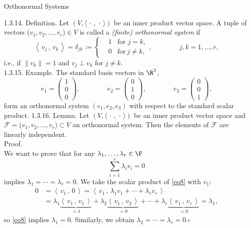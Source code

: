 \documentclass[smaller,hyperref={CJKbookmarks=true}]{beamer}
\newcommand{\myseries}[2]{$#1_1,#1_2,\dots,#1_#2$}
\newcommand{\scp}[2]{\left\langle\,#1\,,\,#2\,\right\rangle} \newcommand{\scpp}{\langle\,\cdot\,,\,\cdot\,\rangle}
\begin{document}
\begin{frame}{Orthonormal Systems}
\begin{spacing}{1}
\alert{1.3.14. Definition.} Let $(V,\scpp)$ be an inner product vector space. A tuple of vectors (\myseries{v}{r})$\in V$ is called a \emph{(finite) orthonormal system} if
\begin{equation*}
  \scp{v_j}{v_k}=\delta_{jk}:=\left\{\begin{aligned}&1\;\;\;\text{for }j=k,\\&0\;\;\;\text{for}~j\neq k,\end{aligned}\right.,\qquad\qquad j,k=1,\ldots,r,
\end{equation*}
i.e., if $\|v_k\|=1$ and $v_j\perp v_k$ for $j\neq k$.\\[12pt]
\alert{1.3.15. Example.} The standard basis vectors in $\R^3$,
\[e_1=\begin{pmatrix}
        1 \\
        0 \\
        0
      \end{pmatrix},\qquad\qquad e_2=\begin{pmatrix}
            0 \\
            1 \\
            0
          \end{pmatrix},\qquad\qquad e_3=\begin{pmatrix}
                0 \\
                0 \\
                1
              \end{pmatrix},\]
form an orthonormal system $(e_1,e_2,e_3)$ with respect to the standard scalar product.
\newpage
\alert{1.3.16. Lemma.} Let $(V,\scpp)$ be an inner product vector space and $\mathcal{F}=$(\myseries{v}{r})$\subset V$ an orthonormal system. Then the elements of $\mathcal{F}$ are linearly independent.\\[6pt]
\alert{Proof.}\\
We want to prove that for any $\lambda_1,\ldots,\lambda_r\in\F$
\begin{equation}\label{eq8}
  \sum_{i=1}^{r}\lambda_iv_i=0
\end{equation}
implies $\lambda_1=\cdots=\lambda_r=0$. We take the scalar product of \eqref{eq8} with $v_1$:
\begin{align*}
  0 &=\scp{v_1}{0}=\scp{v_1}{\lambda_1v_1+\cdots+\lambda_rv_r}  \\
  &=\lambda_1\underbrace{\scp{v_1}{v_1}}_{=1}+\lambda_2\underbrace{\scp{v_1}{v_2}}_{=0}+\cdots+\lambda_r\underbrace{\scp{v_1}{v_r}}_{=0}=\lambda_1,
\end{align*}
so \eqref{eq8} implies $\lambda_1=0$. Similarly, we obtain $\lambda_2=\cdots=\lambda_r=0$.$\square$
\end{spacing}
\end{frame}
\end{document}
